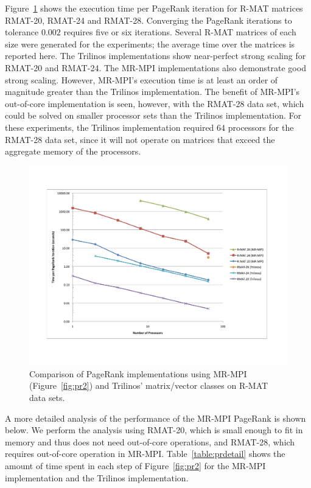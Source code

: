 Figure~\ref{f:pr} shows the execution time per PageRank iteration for
R-MAT matrices RMAT-20, RMAT-24 and RMAT-28.  Converging the PageRank
iterations to tolerance $0.002$ requires five or six iterations.
Several R-MAT matrices of each size were generated for the
experiments; the average time over the matrices is reported here.  The
Trilinos implementations show near-perfect strong scaling for RMAT-20
and RMAT-24.  The MR-MPI implementations also demonstrate good strong
scaling.  However, MR-MPI's execution time is at least an order of
magnitude greater than the Trilinos implementation.  
The benefit of MR-MPI's out-of-core implementation
is seen, however, with the RMAT-28 data set, which could be solved on
smaller processor sets than the Trilinos implementation.  For these
experiments, the Trilinos implementation required 64 processors for
the RMAT-28 data set, since it will not operate on matrices that
exceed the aggregate memory of the processors.

\begin{figure}[htb]
\includegraphics[width=\textwidth]{fig_pagerank.pdf}
\caption{Comparison of PageRank implementations using 
MR-MPI (Figure~\ref{fig:pr2}) and 
Trilinos' matrix/vector classes on R-MAT data sets.}
\label{f:pr}
\end{figure}


A more detailed analysis of the performance of the MR-MPI PageRank is shown
below.  We perform the analysis using RMAT-20, which is small enough to
fit in memory and thus does not need out-of-core operations, and RMAT-28,
which requires out-of-core operation in MR-MPI.  Table~\ref{table:prdetail}
shows the amount of time spent in each step of Figure~\ref{fig:pr2} for 
the MR-MPI implementation and the Trilinos implementation.

